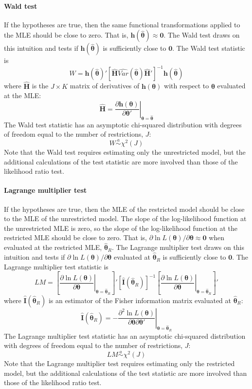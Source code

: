 \documentclass[11pt,letterpaper]{article}
\begin{document}
\paragraph{Wald test} If the hypotheses are true, then the same functional transformations applied to the MLE should be close to zero. That is, $\bm{h}(\widehat{\bm{\theta}}) \approx \bm{0}$. The Wald test draws on this intuition and tests if $\bm{h}(\widehat{\bm{\theta}})$ is sufficiently close to $\bm{0}$. The Wald test statistic is
$$W = \bm{h}(\widehat{\bm{\theta}})' \left[ \widehat{\bm{H}} \widehat{Var}(\widehat{\bm{\theta}}) \widehat{\bm{H}}' \right]^{-1} \bm{h}(\widehat{\bm{\theta}})$$
where $\widehat{\bm{H}}$ is the $J \times K$ matrix of derivatives of $\bm{h}(\bm{\theta})$ with respect to $\bm{\theta}$ evaluated at the MLE:
$$\widehat{\bm{H}} = \left. \frac{\partial \bm{h}(\bm{\theta})}{\partial \bm{\theta}'} \right\vert_{\bm{\theta} = \widehat{\bm{\theta}}}$$
The Wald test statistic has an asymptotic chi-squared distribution with degrees of freedom equal to the number of restrictions, $J$:
$$W \overset{a}{\sim} \chi^2(J)$$
Note that the Wald test requires estimating only the unrestricted model, but the additional calculations of the test statistic are more involved than those of the likelihood ratio test.

\paragraph{Lagrange multiplier test} If the hypotheses are true, then the MLE of the restricted model should be close to the MLE of the unrestricted model. The slope of the log-likelihood function at the unrestricted MLE is zero, so the slope of the log-likelihood function at the restricted MLE should be close to zero. That is, $\partial \ln L(\bm{\theta}) / \partial \bm{\theta} \approx \bm{0}$ when evaluated at the restricted MLE, $\widehat{\bm{\theta}}_R$. The Lagrange multiplier test draws on this intuition and tests if $\partial \ln L(\bm{\theta}) / \partial \bm{\theta}$ evaluated at $\widehat{\bm{\theta}}_R$ is sufficiently close to $\bm{0}$. The Lagrange multiplier test statistic is
$$LM = \left[ \left. \frac{\partial \ln L(\bm{\theta})}{\partial \bm{\theta}} \right\vert_{\bm{\theta} = \widehat{\bm{\theta}}_R} \right]' \left[ \widehat{\bm{I}}(\widehat{\bm{\theta}}_R) \right]^{-1} \left[ \left. \frac{\partial \ln L(\bm{\theta})}{\partial \bm{\theta}} \right\vert_{\bm{\theta} = \widehat{\bm{\theta}}_R} \right]'$$
where $\widehat{\bm{I}}(\widehat{\bm{\theta}}_R)$ is an estimator of the Fisher information matrix evaluated at $\widehat{\bm{\theta}}_R$:
$$\widehat{\bm{I}}(\widehat{\bm{\theta}}_R) = \left. -\frac{\partial^2 \ln L(\bm{\theta})}{\partial \bm{\theta} \partial \bm{\theta}'} \right\vert_{\bm{\theta} = \widehat{\bm{\theta}}_R}$$
The Lagrange multiplier test statistic has an asymptotic chi-squared distribution with degrees of freedom equal to the number of restrictions, $J$:
$$LM \overset{a}{\sim} \chi^2(J)$$
Note that the Lagrange multiplier test requires estimating only the restricted model, but the additional calculations of the test statistic are more involved than those of the likelihood ratio test.
\end{document}
